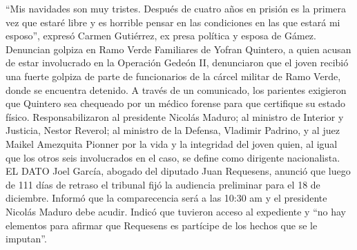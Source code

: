 \documentclass{article}%
\begin{document}
\newline%
%
“Mis navidades son muy tristes. Después de cuatro años en prisión es la primera vez que estaré libre y es horrible pensar en las condiciones en las que estará mi esposo”, expresó Carmen Gutiérrez, ex presa política y esposa de Gámez.%
\newline%
%
Denuncian golpiza en Ramo Verde%
\newline%
%
Familiares de Yofran Quintero, a quien acusan de estar involucrado en la Operación Gedeón II, denunciaron que el joven recibió una fuerte golpiza de parte de funcionarios de la cárcel militar de Ramo Verde, donde se encuentra detenido.%
\newline%
%
A través de un comunicado, los parientes exigieron que Quintero sea chequeado por un médico forense para que certifique su estado físico. Responsabilizaron al presidente Nicolás Maduro; al ministro de Interior y Justicia, Nestor Reverol; al ministro de la Defensa, Vladimir Padrino, y al juez Maikel Amezquita Pionner por la vida y la integridad del joven quien, al igual que los otros seis involucrados en el caso, se define como dirigente nacionalista.%
\newline%
%
EL DATO%
\newline%
%
Joel García, abogado del diputado Juan Requesens, anunció que luego de 111 días de retraso el tribunal fijó la audiencia preliminar para el 18 de diciembre. Informó que la comparecencia será a las 10:30 am y el presidente Nicolás Maduro debe acudir. Indicó que tuvieron acceso al expediente y “no hay elementos para afirmar que Requesens es partícipe de los hechos que se le imputan”.%
\newline%
%
\end{document}
